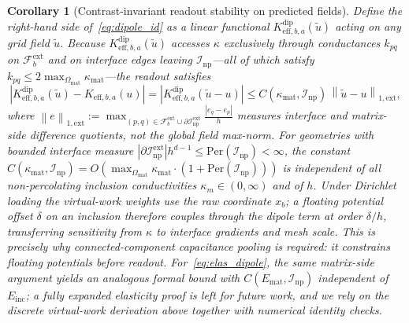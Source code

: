 \documentclass[preprint,11pt]{elsarticle}
\newcommand{\Keffij}[1]{K_{\mathrm{eff},#1}}
\newcommand{\norm}[1]{\left\lVert #1 \right\rVert}
\newcommand{\abs}[1]{\left\lvert #1 \right\rvert}
\newtheorem{corollary}{Corollary}
\begin{document}
\begin{corollary}[Contrast-invariant readout stability on predicted fields]\label{cor:stab}
Define the right-hand side of~\eqref{eq:dipole_id} as a linear functional $\Keffij{b,a}^{\mathrm{dip}}(\tilde u)$ acting on any grid field $\tilde u$. Because $\Keffij{b,a}^{\mathrm{dip}}(\tilde u)$ accesses $\kappa$ exclusively through conductances $k_{pq}$ on $\mathcal{F}_b^{\mathrm{ext}}$ and on interface edges leaving $\mathcal{I}_{\mathrm{np}}$—all of which satisfy $k_{pq} \le 2\max_{\Omega_{\mathrm{mat}}}\kappa_{\mathrm{mat}}$—the readout satisfies
\begin{equation}\label{eq:dip_stab}
  \abs{\Keffij{b,a}^{\mathrm{dip}}(\tilde u) - \Keffij{b,a}(u)}
  = \abs{\Keffij{b,a}^{\mathrm{dip}}(\tilde u - u)}
  \le C(\kappa_{\mathrm{mat}}, \mathcal{I}_{\mathrm{np}})\,\norm{\tilde u - u}_{1,\mathrm{ext}},
\end{equation}
where $\norm{e}_{1,\mathrm{ext}} := \max_{(p,q)\in \mathcal{F}_b^{\mathrm{ext}} \cup \partial\mathcal{I}_{\mathrm{np}}^{\mathrm{ext}}} \frac{\abs{e_q - e_p}}{h}$ measures \emph{interface and matrix-side difference quotients}, not the global field max-norm. For geometries with bounded interface measure $\abs{\partial\mathcal{I}_{\mathrm{np}}^{\mathrm{ext}}} h^{d-1} \le \mathrm{Per}(\mathcal{I}_{\mathrm{np}}) < \infty$, the constant $C(\kappa_{\mathrm{mat}}, \mathcal{I}_{\mathrm{np}}) = O(\max_{\Omega_{\mathrm{mat}}}\kappa_{\mathrm{mat}} \cdot (1 + \mathrm{Per}(\mathcal{I}_{\mathrm{np}})))$ is independent of all non-percolating inclusion conductivities $\kappa_m \in (0, \infty)$ and of $h$. Under Dirichlet loading the virtual-work weights use the raw coordinate $x_b$; a floating potential offset $\delta$ on an inclusion therefore couples through the dipole term at order $\delta/h$, transferring sensitivity from $\kappa$ to interface gradients and mesh scale. This is precisely why connected-component capacitance pooling is required: it constrains floating potentials before readout. For~\eqref{eq:elas_dipole}, the same matrix-side argument yields an analogous formal bound with $C(E_{\mathrm{mat}}, \mathcal{I}_{\mathrm{np}})$ independent of $E_{\mathrm{inc}}$; a fully expanded elasticity proof is left for future work, and we rely on the discrete virtual-work derivation above together with numerical identity checks.
\end{corollary}
\end{document}
